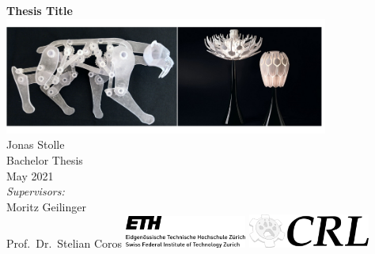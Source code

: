 \documentclass[a4paper,twoside,12pt,nochapterprefix]{scrbook}
\begin{document}
%


\newcommand{\mfytext}[0]{my fancy text}

\newcommand{\chpref}[1]{Chapter \ref{#1}}
\newcommand{\secref}[1]{Section \ref{#1}}
\newcommand{\figref}[1]{Figure \ref{#1}}
\newcommand{\tabref}[1]{Table \ref{#1}}
\newcommand{\apxref}[1]{Appendix \ref{#1}}

%
\begin{titlepage}
	\topmargin 1.0cm
	\oddsidemargin 0.0cm
	\evensidemargin 0.0cm
	\centering
	\Huge
	\vspace{3.0cm}
	\textbf{\textsf{Thesis Title}} \\[2.0cm]
	\includegraphics*[width=0.8\textwidth]{figures/teaser} \\ %
	\vspace{3cm}
	\sffamily
	\Large
	Jonas Stolle
	\\[0.8cm]
	\large
	Bachelor Thesis %
	\\
	May 2021
	\\[1.3cm]
	\emph{Supervisors:}\\
	Moritz Geilinger\\ 					%
	Prof.\ Dr.\ Stelian Coros		%
	\vfill
	\includegraphics*[width=0.3\textwidth]{figures/ETH_logo} \hfill
	\includegraphics*[width=0.3\textwidth]{figures/CRL_logo}
	\vspace{3.4cm}
\end{titlepage}
\clearemptydoublepage
\end{document}
